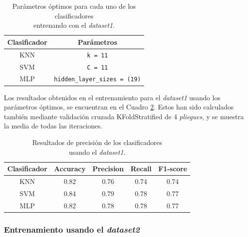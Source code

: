 \begin{table}[H]
\begin{center}
\begin{tabular}{|c|c|}
     \hline
    \textbf{Clasificador} & \textbf{Parámetros} \\
    \hline
     KNN & \verb|k = 11| \\
     SVM & \verb|C = 11| \\
     MLP & \verb|hidden_layer_sizes = (19)|\\
     \hline
 \end{tabular}
 \captionsetup{justification=centering}
\caption{Parámetros óptimos para cada uno de los clasificadores\\
entrenando con el \textit{dataset1}.}
\label{cuadro:parametros_dataset1}
\end{center}
\end{table}

Los resultados obtenidos en el entrenamiento para el \textit{dataset1} usando los parámetros óptimos, se encuentran en el Cuadro \ref{cuadro:resultados_dataset1}. Estos han sido calculados también mediante validación cruzada KFoldStratified de 4 \textit{pliegues}, y se muestra la media de todas las iteraciones.\\

\begin{table}[H]
\begin{center}
\begin{tabular}{|c|c|c|c|c|}
     \hline
    \textbf{Clasificador} & \textbf{Accuracy} & \textbf{Precision} & \textbf{Recall} & \textbf{F1-score}\\
    \hline
     KNN & 0.82 & 0.76 & 0.74 & 0.74\\
     SVM & 0.84 & 0.79 & 0.78 & 0.77\\
     MLP & 0.82 & 0.78 & 0.78 & 0.77\\
     \hline
 \end{tabular}
 \captionsetup{justification=centering}
\caption{Resultados de precisión de los clasificadores\\
usando el \textit{dataset1}.}
\label{cuadro:resultados_dataset1}
\end{center}
\end{table}

\subsubsection{Entrenamiento usando el \textit{dataset2}}

